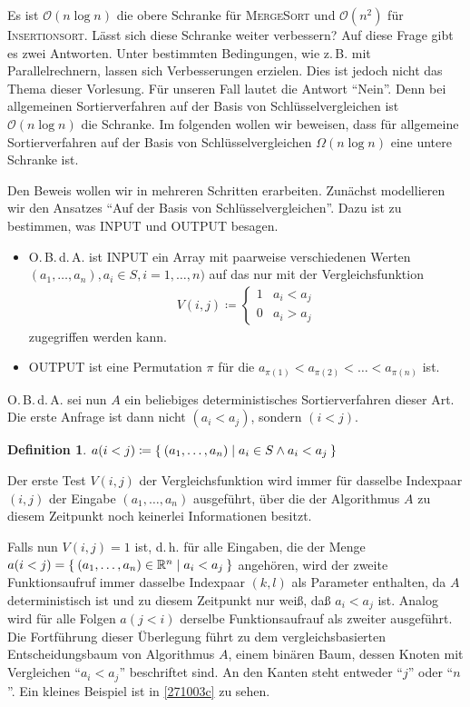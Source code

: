 \documentclass[ngerman,draft,parskip=half*,twoside]{scrreprt}
\theoremstyle{break}
\newtheorem{definition}{Definition}[chapter]
\theoremstyle{nonumberbreak}
\newcommand*{\OO}{\mathcal{O}}      %
\newcommand*{\R}{\mathbb{R}}        %
\begin{document}
Es ist $\OO(n\log n)$ die obere Schranke für \textsc{MergeSort} und
$\OO(n^2)$ für \textsc{Insertionsort}. Lässt sich diese Schranke
weiter verbessern? Auf diese Frage gibt es zwei Antworten. Unter
bestimmten Bedingungen, wie z.\,B. mit Parallelrechnern, lassen sich
Verbesserungen erzielen. Dies ist jedoch nicht das Thema dieser
Vorlesung. Für unseren Fall lautet die Antwort "`Nein"'. Denn bei
allgemeinen Sortierverfahren auf der Basis von Schlüsselvergleichen
ist $\OO(n\log n)$ die Schranke. Im folgenden wollen wir beweisen,
dass für allgemeine Sortierverfahren auf der Basis von
Schlüsselvergleichen $ \Omega(n\log n)$ eine untere Schranke ist.

Den Beweis wollen wir in mehreren Schritten erarbeiten. Zunächst
modellieren wir den Ansatzes "`Auf der Basis von
Schlüsselvergleichen"'. Dazu ist zu bestimmen, was INPUT und OUTPUT
besagen.
\begin{itemize}
\item O.\,B.\,d.\,A. ist INPUT ein Array mit paarweise verschiedenen
  Werten $(a_1, \ldots , a_{n}), a_i \in S, i=1, \ldots, n)$ auf
  das nur mit der Vergleichsfunktion
  \begin{gather*}
    V(i,j) \coloneqq
    \begin{cases}
      1 & a_i < a_j\\
      0 & a_i > a_j
    \end{cases}
  \end{gather*}
  zugegriffen werden kann.
\item OUTPUT ist eine Permutation $\pi$ für die $a_{\pi (1)} < a_{\pi
    (2)} < \ldots < a_{\pi (n)}$ ist.
\end{itemize}

O.\,B.\,d.\,A. sei nun $A$ ein beliebiges deterministisches
Sortierverfahren dieser Art.  Die erste Anfrage ist dann nicht $(a_i <
a_j)$, sondern $(i < j)$.

\begin{definition}
  $a(i<j) \coloneqq \Set{(a_1, \dots , a_n) | a_i \in S \wedge
  a_i < a_j}$
\end{definition}

%
Der erste Test $V(i,j)$ der Vergleichsfunktion wird immer für dasselbe
Indexpaar $(i,j)$ der Eingabe $(a_1, \ldots , a_{n})$ ausgeführt, über
die der Algorithmus $A$ zu diesem Zeitpunkt noch keinerlei
Informationen besitzt.

Falls nun $V(i,j)=1$ ist, d.\,h. für alle Eingaben, die der Menge
$a(i<j)= \Set{(a_1,\ldots,a_{n})\in \R^n | a_{i} <a_{j}}$ angehören,
wird der zweite Funktionsaufruf immer dasselbe Indexpaar $(k,l)$ als
Parameter enthalten, da $A$ deterministisch ist und zu diesem
Zeitpunkt nur weiß, daß $a_{i}<a_{j}$ ist. Analog wird für alle Folgen
$a(j<i)$ derselbe Funktionsaufrauf als zweiter ausgeführt. Die
Fortführung dieser Überlegung führt zu dem vergleichsbasierten
Entscheidungsbaum von Algorithmus $A$, einem binären Baum, dessen
Knoten mit Vergleichen "`$a_{i}<a_{j}$"' beschriftet sind. An den
Kanten steht entweder "`$j$"' oder "`$n$"'. Ein kleines Beispiel ist
in \autoref{271003c} zu sehen.
\end{document}
